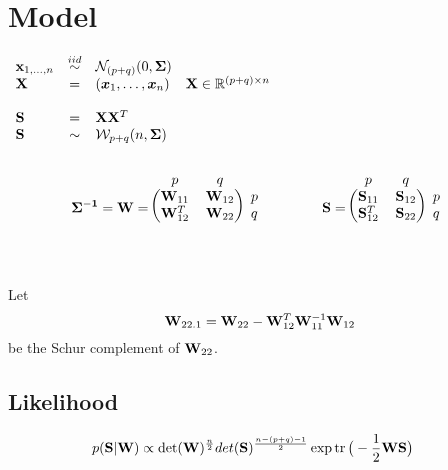 \section{Model}
\label{A:model}
\begin{math}
\\
\begin{array}{lclr}
\mathbf{x}_{1,\dots,n} &\overset{iid}{\sim}& \mathcal{N}_{(p+q)}(0, \mathbf{\Sigma})
\\
\mathbf{X}&=&(\bm{x}_1,\dots,\bm{x}_n)  & \mathbf{X}\in \mathbb{R}^{(p+q)\times n}
\\ \\
\mathbf{S} &=& \mathbf{X} \mathbf{X}^T
\\
\mathbf{S} &\sim& \mathcal{W}_{p+q}(n, \mathbf{\Sigma})
\end{array}
\end{math}
\\
\\
\begin{equation*}
\matr{\Sigma^{-1}} = \matr{W}=
\raisebox{0.3\baselineskip}{$
	\begin{blockarray}{ccc}
	p & q& \\
	\begin{block}{(cc)l}
		\matr{W}_{11} & \matr{W}_{12}&p \\
		\matr{W}_{12}^T & \matr{W}_{22}&q \\
	\end{block}
	\end{blockarray}
$}
\quad \quad \quad \quad 
\matr{S}=
\raisebox{0.3\baselineskip}{$
	\begin{blockarray}{ccc}
	p & q& \\
	\begin{block}{(cc)l}
	\matr{S}_{11} & \matr{S}_{12}&p \\
	\matr{S}_{12}^T & \matr{S}_{22}&q \\
	\end{block}
	\end{blockarray}
	$}
\end{equation*}
\\ \\
Let 
$$\mathbf{W}_{22.1} = \mathbf{W}_{22} - \mathbf{W}_{12}^T \mathbf{W}_{11}^{-1} \mathbf{W}_{12}$$
be the Schur complement of $\mathbf{W}_{22}$.


\subsection{Likelihood}

\begin{align*}
p(\mathbf{S}|\mathbf{W}) &\propto \det(\mathbf{W})^{\frac{n}{2}} det(\mathbf{S})^{\frac{n-(p+q)-1}{2} }\exp \operatorname{tr} \big( - \frac{1}{2} \mathbf{W} \mathbf{S}\big)
\end{align*}

